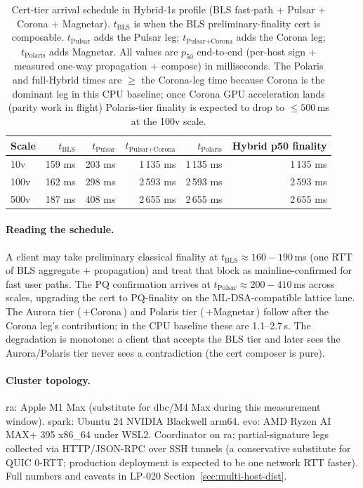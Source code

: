 \begin{table}[ht]
\centering
\small
\begin{tabular}{@{}lrrrrr@{}}
\toprule
\textbf{Scale} & \textbf{$t_{\text{BLS}}$} & \textbf{$t_{\text{Pulsar}}$} & \textbf{$t_{\text{Pulsar+Corona}}$} & \textbf{$t_{\text{Polaris}}$} & \textbf{Hybrid p50 finality} \\
\midrule
10v   & 159 ms & 203 ms & 1\,135 ms & 1\,135 ms & 1\,135 ms \\
100v  & 162 ms & 298 ms & 2\,593 ms & 2\,593 ms & 2\,593 ms \\
500v  & 187 ms & 408 ms & 2\,655 ms & 2\,655 ms & 2\,655 ms \\
\bottomrule
\end{tabular}
\caption{Cert-tier arrival schedule in Hybrid-1s profile (BLS
fast-path + Pulsar + Corona + Magnetar). $t_{\text{BLS}}$ is when
the BLS preliminary-finality cert is composable. $t_{\text{Pulsar}}$
adds the Pulsar leg; $t_{\text{Pulsar+Corona}}$ adds the Corona
leg; $t_{\text{Polaris}}$ adds Magnetar. All values are
$p_{50}$ end-to-end (per-host sign + measured one-way propagation
+ compose) in milliseconds. The Polaris and full-Hybrid times are
$\geq$ the Corona-leg time because Corona is the dominant leg in
this CPU baseline; once Corona GPU acceleration lands (parity work
in flight) Polaris-tier finality is expected to drop to
$\leq 500$\,ms at the 100v scale.}
\label{tab:cert-tier-degradation}
\end{table}

\paragraph{Reading the schedule.} A client may take preliminary
classical finality at $t_{\text{BLS}} \approx 160{-}190$\,ms (one
RTT of BLS aggregate + propagation) and treat that block as
mainline-confirmed for fast user paths. The PQ confirmation arrives
at $t_{\text{Pulsar}} \approx 200{-}410$\,ms across scales,
upgrading the cert to PQ-finality on the ML-DSA-compatible lattice
lane. The Aurora tier (\,$+$Corona\,) and Polaris tier (\,$+$Magnetar\,)
follow after the Corona leg's contribution; in the CPU baseline
these are 1.1--2.7\,s. The degradation is monotone: a client that
accepts the BLS tier and later sees the Aurora/Polaris tier never
sees a contradiction (the cert composer is pure).

\paragraph{Cluster topology.} ra: Apple M1 Max (substitute for
dbc/M4 Max during this measurement window). spark: Ubuntu 24
NVIDIA Blackwell arm64. evo: AMD Ryzen AI MAX+ 395 x86\_64 under
WSL2. Coordinator on ra; partial-signature legs collected via
HTTP/JSON-RPC over SSH tunnels (a conservative substitute for
QUIC 0-RTT; production deployment is expected to be one network
RTT faster). Full numbers and caveats in
LP-020 Section~\ref{sec:multi-host-dist}.

